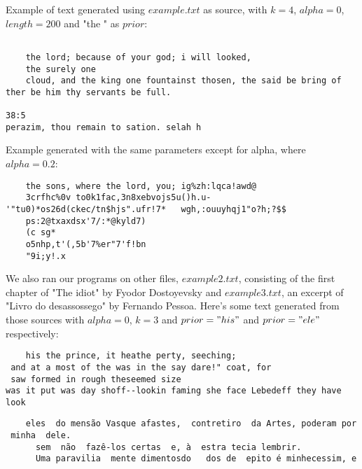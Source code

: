 \documentclass{article}
\begin{document}
	\vspace{1cm}
	\begin{center}
	
	\end{center}
	Example of text generated using $\textit{example.txt}$ as source, with $k=4$, $alpha=0$, $length=200$ and "the " as $\textit{prior}$:
	\begin{verbatim}
	
	the lord; because of your god; i will looked,
	the surely one
	cloud, and the king one fountainst thosen, the said be bring of ther be him thy servants be full.

38:5
perazim, thou remain to sation. selah h
	\end{verbatim}
	Example generated with the same parameters except for alpha, where ${alpha=0.2}$:
	\begin{verbatim}
	the sons, where the lord, you; ig%zh:lqca!awd@
	3crfhc%0v to0k1fac,3n8xebvojs5u()h.u-'"tu0)*os26d(ckec/tn$hjs".ufr!7* 	wgh,:ouuyhqj1"o?h;?$$
	ps:2@txaxdsx'7/:*@kyld7)
	(c sg*
	o5nhp,t'(,5b'7%er"7'f!bn
	"9i;y!.x
\end{verbatim}	
	\newpage	
	We also ran our programs on other files, $\textit{example2.txt}$, consisting of the first chapter of "The idiot" by Fyodor Dostoyevsky and $\textit{example3.txt}$, an excerpt of "Livro do desassossego" by Fernando Pessoa.
	Here's some text generated from those sources with $alpha=0$, $k=3$ and $prior="his"$ and $prior="ele"$ respectively:
	\begin{verbatim}
	his the prince, it heathe perty, seeching;
 and at a most of the was in the say dare!" coat, for 
 saw formed in rough theseemed size 
was it put was day shoff--lookin faming she face Lebedeff they have look
	\end{verbatim}
	
	\begin{verbatim}
	eles  do mensão Vasque afastes,  contretiro  da Artes, poderam por 
 minha  dele.
	  sem  não  fazê-los certas  e, à  estra tecia lembrir. 
	  Uma paravilia  mente dimentosdo   dos de  epito é minhecessim, e
	\end{verbatim}
\end{document}
